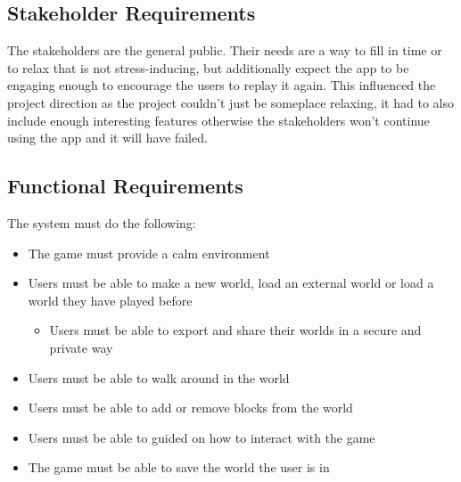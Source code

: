 \documentclass[14pt]{article}
\begin{document}
\subsection{Stakeholder Requirements}
The stakeholders are the general public. Their needs are a way to fill in time or to relax that is not stress-inducing, but additionally expect the app to be engaging enough to encourage the users to replay it again. This influenced the project direction as the project couldn't just be someplace relaxing, it had to also include enough interesting features otherwise the stakeholders won't continue using the app and it will have failed.

\subsection{Functional Requirements}
The system must do the following:
\begin{itemize}
  \item The game must provide a calm environment
  \item Users must be able to make a new world, load an external world or load a world they have played before
  \begin{itemize}
    \item Users must be able to export and share their worlds in a secure and private way
  \end{itemize}
  \item Users must be able to walk around in the world
  \item Users must be able to add or remove blocks from the world
  \item Users must be able to guided on how to interact with the game
  \item The game must be able to save the world the user is in
\end{itemize}
\end{document}
